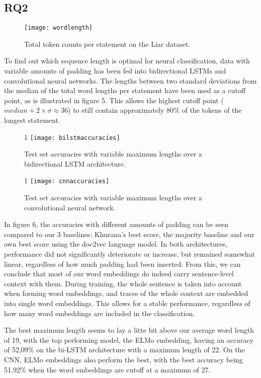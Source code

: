 \subsection{RQ2}

\begin{figure}[b!]
    \centering
    \texttt{[image: wordlength]}
    \caption{Total token counts per statement on the Liar dataset.}
\end{figure}

To find out which sequence length is optimal for neural classification, data with variable amounts of padding has been fed into bidirectional LSTMs and convolutional neural networks.
The lengths between two standard deviations from the median of the total word lengths per statement have been used as a cutoff point, as is illustrated in figure 5. 
This allows the highest cutoff point (\(median + 2 \times \sigma \approx 36\)) to still contain approximately 80\% of the tokens of the longest statement.

\begin{figure}[b]{1\textwidth}
    \texttt{[image: bilstmaccuracies]}
    \caption{Test set accuracies with variable maximum lengths over a bidirectional LSTM architecture.}
\end{figure}
    
\begin{figure}[b]{1\textwidth}
    \texttt{[image: cnnaccuracies]}
    \caption{Test set accuracies with variable maximum lengths over a convolutional neural network.}
\end{figure}

In figure 6, the accuracies with different amounts of padding can be seen compared to our 3 baselines: Khurana's best score, the majority baseline and our own best score using the doc2vec language model.
In both architectures, performance did not significantly deteriorate or increase, but remained somewhat linear, regardless of how much padding had been inserted.
From this, we can conclude that most of our word embeddings do indeed carry sentence-level context with them.
During training, the whole sentence is taken into account when forming word embeddings, and traces of the whole context are embedded into single word embeddings.
This allows for a stable performance, regardless of how many word embeddings are included in the classification.

The best maximum length seems to lay a litte bit above our average word length of 19, with the top performing model, the ELMo embedding, having an accuracy of 52,09\% on the bi-LSTM architecture with a maximum length of 22.
On the CNN, ELMo embeddings also perform the best, with the best accuracy being 51,92\% when the word embeddings are cutoff at a maximum of 27. 

